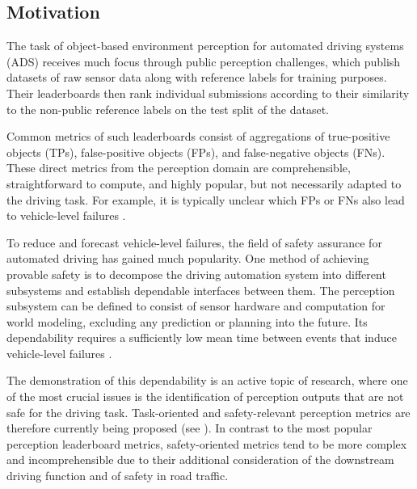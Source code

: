 \documentclass[conference]{IEEEtran}
\begin{document}
\subsection{Motivation}

The task of object-based environment perception for automated driving systems (ADS) receives much focus through public perception challenges, %
which publish datasets of raw sensor data along with reference labels for training purposes. 
Their leaderboards then rank individual submissions according to their similarity to the non-public reference labels on the test split of the dataset.

Common metrics of such leaderboards consist of aggregations of true-positive objects (TPs), false-positive objects (FPs), and false-negative objects (FNs). 
These direct metrics from the perception domain are comprehensible, straightforward to compute, and highly popular, but not necessarily adapted to the driving task. 
For example, it is typically unclear which FPs or FNs also lead to vehicle-level failures \cite{Topan2022zones}. 

To reduce and forecast vehicle-level failures, the field of safety assurance for automated driving has gained much popularity. 
One method of achieving provable safety is to decompose the driving automation system into different subsystems and establish dependable interfaces between them. 
The perception subsystem can be defined to consist of sensor hardware and computation for world modeling, excluding any prediction or planning into the future. 
Its dependability requires a sufficiently low mean time between events that induce vehicle-level failures \cite{Oboril2022mtbf_ieee}. 


The demonstration of this dependability is an active topic of research, where one of the most crucial issues is the identification of perception outputs that are not safe for the driving task. 
Task-oriented and safety-relevant perception metrics are therefore currently being proposed (see  \cite{Lyssenko2022safety, Hoss2023rollingreview}). 
In contrast to the most popular perception leaderboard metrics, safety-oriented metrics tend to be more complex and incomprehensible due to their additional consideration of the downstream driving function and of safety in road traffic. 
\end{document}
